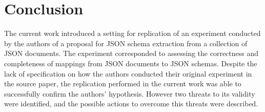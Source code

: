 \documentclass[sigconf, nonacm]{acmart}
\begin{document}
\section{Conclusion}

The current work introduced a setting for replication of an experiment conducted by the authors of a proposal for JSON schema extraction from a collection of JSON documents. The experiment corresponded to assessing the correctness and completeness of mappings from JSON documents to JSON schemas. Despite the lack of specification on how the authors conducted their original experiment in the source paper, the replication performed in the current work was able to successfully confirm the authors' hypothesis. However two threats to its validity were identified, and the possible actions to overcome this threats were described.



\end{document}
